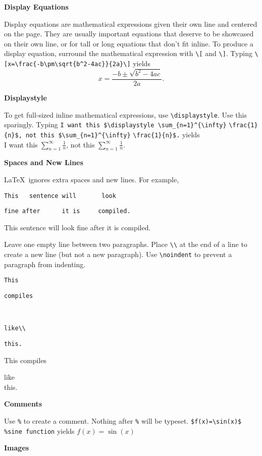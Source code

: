\documentclass[10pt,landscape]{article}
\newcommand{\ColorSection}[1]{\par\vspace{1.5ex}\noindent\textcolor{sectioncolor}{\Large\bfseries #1}\par\vspace{0.75ex}}
\newcommand{\ColorSubsection}[1]{\par\vspace{1ex}\noindent\textcolor{subsectioncolor}{\normalsize\bfseries #1}\par\vspace{0.5ex}}
\begin{document}
\begin{multicols}{3}
\ColorSubsection{Display Equations}
Display equations are mathematical expressions given their own line and centered on the page. They are usually important equations that deserve to be showcased on their own line, or for tall or long equations that don't fit inline. To produce a display equation, surround the mathematical expression with \verb!\[! and \verb!\]!. Typing \verb!\[x=\frac{-b\pm\sqrt{b^2-4ac}}{2a}\]! yields \[x=\frac{-b\pm\sqrt{b^2-4ac}}{2a}.\]
 
\ColorSubsection{Displaystyle} 
To get full-sized inline mathematical expressions, use  \verb!\displaystyle!. Use this sparingly. Typing \verb!I want this $\displaystyle \sum_{n=1}^{\infty}! \verb!\frac{1}{n}$, not this $\sum_{n=1}^{\infty}! \verb!\frac{1}{n}$.! yields\\ I want  this $\displaystyle \sum_{n=1}^{\infty}\frac{1}{n}$, not this $\sum_{n=1}^{\infty}\frac{1}{n}.$



\columnbreak



\ColorSection{Spaces and New Lines}

\LaTeX\ ignores extra spaces and new lines. For example, 

\verb!This   sentence will       look!

\verb!fine after      it is     compiled.!

This   sentence will       look
fine after      it is     compiled.


Leave one empty line between two paragraphs. Place \verb!\\! at the end of a line to create a new line (but not a new paragraph). Use  \verb!\noindent! to prevent a paragraph from indenting.

\verb!This!

\verb!compiles!

~

\verb!like\\!

\verb!this.!

This
compiles 

like\\
this.



\ColorSection{Comments}

Use \verb!%! to create a comment. Nothing after \verb!%! will be typeset. \verb!$f(x)=\sin(x)$ %sine function! yields $f(x)=\sin(x)$

\ColorSection{Images}


\end{multicols}
\end{document}
